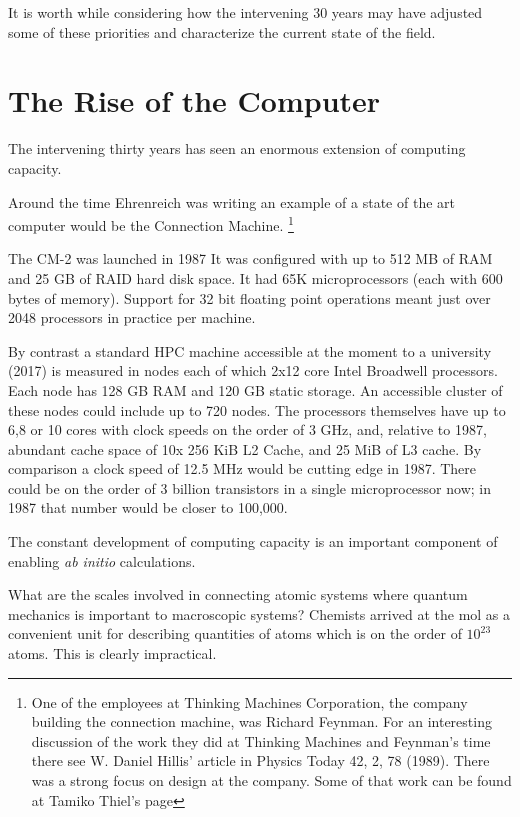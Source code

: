 It is worth while considering how the intervening 30 years may have adjusted some of 
these priorities and characterize the current state of the field.

\section{The Rise of the Computer}
The intervening thirty years has seen an enormous extension of 
computing capacity. 

Around the time Ehrenreich was writing an example of a 
state of the art computer would be the Connection Machine.
\footnote{One of the employees at Thinking Machines Corporation,
the company building the connection machine, was Richard Feynman.
For an interesting discussion of the work they
did at Thinking Machines and Feynman's time there see W. Daniel
Hillis' article in Physics Today 42, 2, 78 (1989).
There was a strong focus on design at the company. Some of that
work can be found at Tamiko Thiel's page}%

The CM-2 was launched in 1987 It was configured with up to 512 MB of RAM and 25 GB of RAID
hard disk space. It had 65K microprocessors (each with 600 bytes of memory). Support for
32 bit floating point operations meant just over 2048 processors in practice per machine.

By contrast a standard HPC machine accessible at the moment to a university (2017) 
is measured in nodes each of which 2x12 core Intel Broadwell processors.
Each node has 128 GB RAM and 120 GB static storage. An accessible 
cluster of these nodes could include up to 720 nodes. The processors themselves have 
up to 6,8 or 10 cores with clock speeds on the order of 3 GHz, and, relative to 1987,
abundant cache space of 10x 256 KiB L2 Cache, and 25 MiB of L3 cache. 
By comparison a clock speed of 12.5 MHz would be cutting edge in 1987. 
There could be on the order of 3 billion transistors in a single microprocessor now;
in 1987 that number would be closer to 100,000. 

The constant development of computing capacity is an important component of enabling
{\it ab initio} calculations. 

What are the scales involved in connecting atomic systems where quantum mechanics is important
to macroscopic systems? Chemists arrived at the mol as a convenient unit for describing
quantities of atoms which is on the order of $10^{23}$ atoms. This is clearly impractical.


